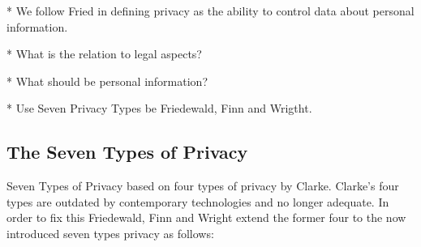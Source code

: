 
* We follow Fried in defining privacy as the ability to control data about personal information.

* What is the relation to legal aspects?

* What should be personal information?

* Use Seven Privacy Types be Friedewald, Finn and Wrigtht.

\subsection{The Seven Types of Privacy}

Seven Types of Privacy based on four types of privacy by Clarke.
Clarke's four types are outdated by contemporary technologies and no longer adequate. 
In order to fix this Friedewald, Finn and Wright extend the former four to the now introduced seven types privacy as follows:

